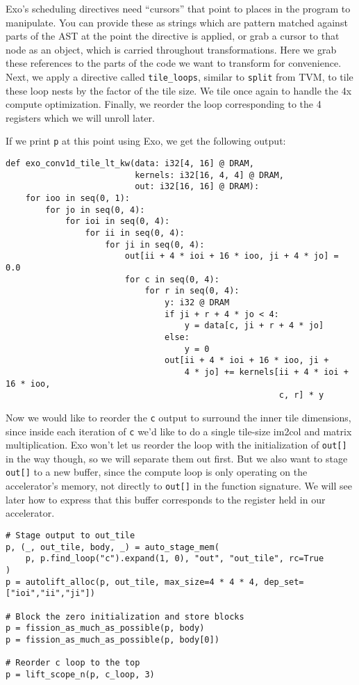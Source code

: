 \documentclass[acmsmall, nonacm=true]{acmart}
\begin{document}
Exo's scheduling directives need ``cursors'' that point to places in the program to manipulate. You can provide these as strings which are pattern matched against parts of the AST at the point the directive is applied, or grab a cursor to that node as an object, which is carried throughout transformations. Here we grab these references to the parts of the code we want to transform for convenience. Next, we apply a directive called \verb|tile_loops|, similar to \verb|split| from TVM, to tile these loop nests by the factor of the tile size. We tile once again to handle the 4x compute optimization. Finally, we reorder the loop corresponding to the 4 registers which we will unroll later.

If we print \verb|p| at this point using Exo, we get the following output:
\begin{verbatim}
def exo_conv1d_tile_lt_kw(data: i32[4, 16] @ DRAM,
                          kernels: i32[16, 4, 4] @ DRAM,
                          out: i32[16, 16] @ DRAM):
    for ioo in seq(0, 1):
        for jo in seq(0, 4):
            for ioi in seq(0, 4):
                for ii in seq(0, 4):
                    for ji in seq(0, 4):
                        out[ii + 4 * ioi + 16 * ioo, ji + 4 * jo] = 0.0
                        for c in seq(0, 4):
                            for r in seq(0, 4):
                                y: i32 @ DRAM
                                if ji + r + 4 * jo < 4:
                                    y = data[c, ji + r + 4 * jo]
                                else:
                                    y = 0
                                out[ii + 4 * ioi + 16 * ioo, ji +
                                    4 * jo] += kernels[ii + 4 * ioi + 16 * ioo,
                                                       c, r] * y
\end{verbatim}
Now we would like to reorder the \verb|c| output to surround the inner tile dimensions, since inside each iteration of \verb|c| we'd like to do a single tile-size im2col and matrix multiplication. Exo won't let us reorder the loop with the initialization of \verb|out[]| in the way though,
 so we will separate them out first. But we also want to stage \verb|out[]| to a new buffer, since the compute loop is only operating on the accelerator's memory, not directly to \verb|out[]| in the function signature. We will see later how to express that this buffer corresponds to the register held in our accelerator. 

\begin{verbatim}
# Stage output to out_tile
p, (_, out_tile, body, _) = auto_stage_mem(
    p, p.find_loop("c").expand(1, 0), "out", "out_tile", rc=True
)
p = autolift_alloc(p, out_tile, max_size=4 * 4 * 4, dep_set=["ioi","ii","ji"])

# Block the zero initialization and store blocks
p = fission_as_much_as_possible(p, body)
p = fission_as_much_as_possible(p, body[0])

# Reorder c loop to the top
p = lift_scope_n(p, c_loop, 3)
\end{verbatim}
\end{document}
